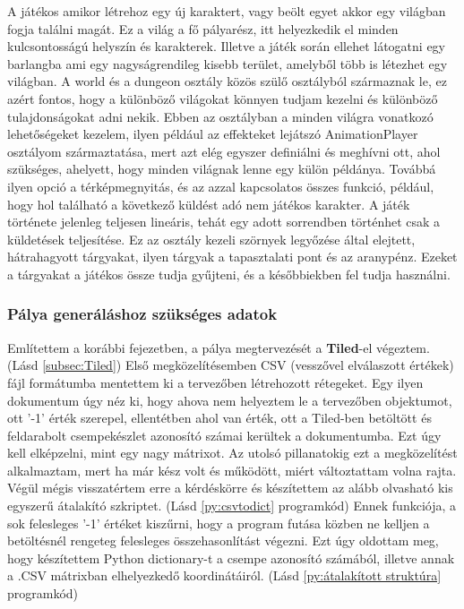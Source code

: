  A játékos amikor létrehoz egy új karaktert, vagy beölt egyet akkor egy világban fogja találni magát. Ez a világ a fő pályarész, itt helyezkedik el minden kulcsontosságú helyszín és karakterek. Illetve a játék során ellehet látogatni egy barlangba ami egy nagyságrendileg kisebb terület, amelyből több is létezhet egy világban.
 A world és a dungeon osztály közös szülő osztályból származnak le, ez azért fontos, hogy a különböző világokat könnyen tudjam kezelni
 és különböző tulajdonságokat adni nekik. Ebben az osztályban a minden világra vonatkozó lehetőségeket kezelem, ilyen például
  az effekteket lejátszó AnimationPlayer osztályom származtatása, mert azt elég egyszer definiálni és meghívni ott, ahol szükséges, ahelyett,
   hogy minden világnak lenne egy külön példánya. Továbbá ilyen opció a térképmegnyitás, és az azzal kapcsolatos összes funkció,
    például, hogy hol található a következő küldést adó nem játékos karakter. A játék története jelenleg teljesen lineáris,
     tehát egy adott sorrendben történhet csak a küldetések teljesítése. Ez az osztály kezeli szörnyek legyőzése által elejtett, hátrahagyott tárgyakat, ilyen tárgyak a tapasztalati pont és az aranypénz.
       Ezeket a tárgyakat a játékos össze tudja gyűjteni, és a későbbiekben fel tudja használni.  

\subsubsection{Pálya generáláshoz szükséges adatok} \label {subsec:Pálya generáláshoz szükséges adatok}

 Említettem a korábbi fejezetben, a pálya megtervezését a \textbf{Tiled}-el végeztem. (Lásd \ref{subsec:Tiled}) 
Első megközelítésemben CSV (vesszővel elválaszott értékek) fájl formátumba mentettem ki a tervezőben létrehozott rétegeket. Egy ilyen dokumentum úgy néz ki, hogy ahova nem helyeztem le a tervezőben objektumot, ott '-1' érték szerepel, ellentétben ahol van érték, ott a Tiled-ben betöltött és feldarabolt csempekészlet azonosító számai kerültek a dokumentumba. Ezt úgy kell elképzelni, mint egy nagy mátrixot. Az utolsó pillanatokig ezt a megközelítést alkalmaztam, mert ha már kész volt és működött, miért változtattam volna rajta. Végül mégis visszatértem erre a kérdéskörre és készítettem az alább olvasható kis egyszerű átalakító szkriptet. (Lásd \ref{py:csvtodict} programkód) Ennek funkciója, a sok felesleges '-1' értéket kiszűrni, hogy a program futása közben ne kelljen a betöltésnél rengeteg felesleges összehasonlítást végezni. Ezt úgy oldottam meg, hogy készítettem Python dictionary-t a csempe azonosító számából, illetve annak a .CSV mátrixban elhelyezkedő koordinátáiról. (Lásd \ref{py:átalakított struktúra} programkód)


